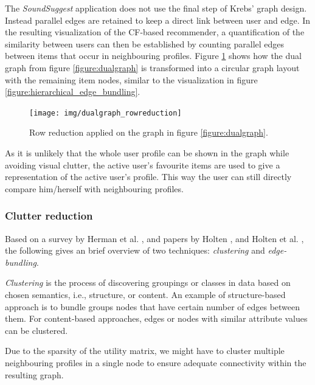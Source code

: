 The \emph{SoundSuggest} application does not use the final step of Krebs' graph design. Instead parallel edges are retained to keep a direct link between user and edge. In the resulting visualization of the CF-based recommender, a quantification of the similarity between users can then be established by counting parallel edges between items that occur in neighbouring profiles. Figure \ref{figure:rowreduction_dualgraph} shows how the dual graph from figure \ref{figure:dualgraph} is transformed into a circular graph layout with the remaining item nodes, similar to the visualization in figure \ref{figure:hierarchical_edge_bundling}.

\begin{figure}%
	\begin{center}
		\texttt{[image: img/dualgraph\_rowreduction]}%
	\end{center}
	\caption{Row reduction applied on the graph in figure \ref{figure:dualgraph}.}%
	\label{figure:rowreduction_dualgraph}%
\end{figure}

As it is unlikely that the whole user profile can be shown in the graph while avoiding visual clutter, the active user's favourite items are used to give a representation of the active user's profile. This way the user can still directly compare him/herself with neighbouring profiles.


\subsubsection{Clutter reduction}

Based on a survey by Herman et al. \cite{herman:2000}, and papers by Holten \cite{Holten:2006:HEB:1187627.1187772}, and Holten et al. \cite{holten:2009}, the following gives an brief overview of two techniques: \emph{clustering} and \emph{edge-bundling}.

\emph{Clustering} is the process of discovering groupings or classes in data based on chosen semantics, i.e., structure, or content. An example of structure-based approach is to bundle groups nodes that have certain number of edges between them. For content-based approaches, edges or nodes with similar attribute values can be clustered.

Due to the sparsity of the utility matrix, we might have to cluster multiple neighbouring profiles in a single node to ensure adequate connectivity within the resulting graph.

